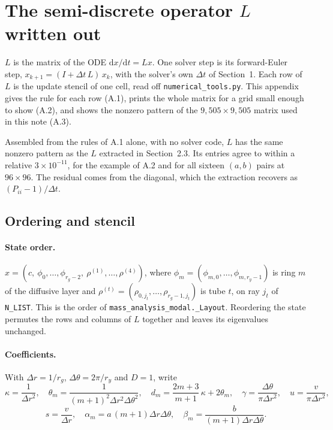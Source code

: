 \documentclass[11pt]{article}
\newcommand{\code}[1]{\texttt{#1}}
\begin{document}
\appendix
\section{The semi-discrete operator \texorpdfstring{$L$}{L} written out}

$L$ is the matrix of the ODE $\mathrm{d}x/\mathrm{d}t = Lx$. One solver step is its forward-Euler step,
$x_{k+1} = (I + \Delta t\, L)\, x_k$, with the solver's own $\Delta t$ of Section~1. Each row of $L$ is the
update stencil of one cell, read off \code{numerical\_tools.py}. This appendix gives the rule for each row
(A.1), prints the whole matrix for a grid small enough to show (A.2), and shows the nonzero pattern of the
$9{,}505 \times 9{,}505$ matrix used in this note (A.3).

Assembled from the rules of A.1 alone, with no solver code, $L$ has the same nonzero pattern as the $L$
extracted in Section~2.3. Its entries agree to within a relative $3 \times 10^{-11}$, for the example of
A.2 and for all sixteen $(a, b)$ pairs at $96 \times 96$. The residual comes from the diagonal, which
the extraction recovers as $(P_{ii} - 1)/\Delta t$.

\subsection{Ordering and stencil}

\paragraph{State order.} $x = (c,\ \phi_0, \dots, \phi_{r_g-2},\ \rho^{(1)}, \dots, \rho^{(4)})$, where
$\phi_m = (\phi_{m,0}, \dots, \phi_{m,r_y-1})$ is ring $m$ of the diffusive layer and
$\rho^{(t)} = (\rho_{0,j_t}, \dots, \rho_{r_g-1,j_t})$ is tube $t$, on ray $j_t$ of \code{N\_LIST}. This is
the order of \code{mass\_analysis\_modal.\_Layout}. Reordering the state permutes the rows and columns of
$L$ together and leaves its eigenvalues unchanged.

\paragraph{Coefficients.} With $\Delta r = 1/r_g$, $\Delta\theta = 2\pi/r_y$ and $D = 1$, write
\[
\kappa = \frac{1}{\Delta r^2},\quad
\theta_m = \frac{1}{(m+1)^2\Delta r^2\Delta\theta^2},\quad
d_m = \frac{2m+3}{m+1}\,\kappa + 2\theta_m,\quad
\gamma = \frac{\Delta\theta}{\pi\Delta r^2},\quad
u = \frac{v}{\pi\Delta r^2},
\]
\[
s = \frac{v}{\Delta r},\quad
\alpha_m = a\,(m+1)\Delta r\Delta\theta,\quad
\beta_m = \frac{b}{(m+1)\Delta r\Delta\theta}.
\]
\end{document}
